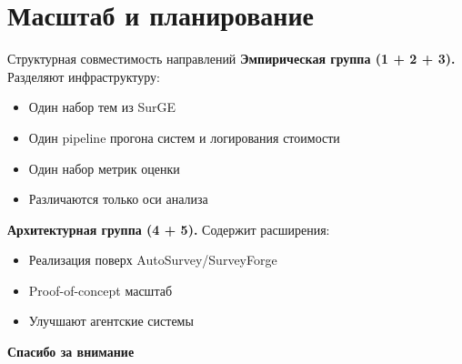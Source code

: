 \documentclass[10pt,aspectratio=169]{beamer}
\begin{document}
\section{Масштаб и планирование}

\begin{frame}{Структурная совместимость направлений}
  \textbf{Эмпирическая группа (1 + 2 + 3).} Разделяют инфраструктуру:
  \begin{itemize}
    \item Один набор тем из SurGE
    \item Один pipeline прогона систем и логирования стоимости
    \item Один набор метрик оценки
    \item Различаются только оси анализа
  \end{itemize}

  \vspace{0.3cm}
  \textbf{Архитектурная группа (4 + 5).} Содержит расширения:
  \begin{itemize}
    \item Реализация поверх AutoSurvey/SurveyForge
    \item Proof-of-concept масштаб
    \item Улучшают агентские системы
  \end{itemize}
\end{frame}

\begin{frame}
  \begin{center}
    \Large \textbf{Спасибо за внимание}
  \end{center}
\end{frame}
\end{document}
